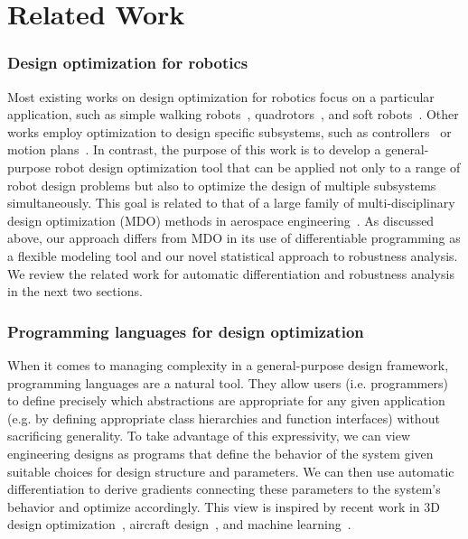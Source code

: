 \section{Related Work}\label{ch:rss:related_work}

\subsubsection{Design optimization for robotics}

Most existing works on design optimization for robotics focus on a particular application, such as simple walking robots~\cite{Schulz_robogami}, quadrotors~\cite{du2016computational}, and soft robots~\cite{soft_robot_optimization_review,du2021underwater,ma2021diffaqua}. Other works employ optimization to design specific subsystems, such as controllers~\cite{xu_uav_controllers} or motion plans~\cite{schulmanMotionPlanningSequential2014}.
In contrast, the purpose of this work is to develop a general-purpose robot design optimization tool that can be applied not only to a range of robot design problems but also to optimize the design of multiple subsystems simultaneously. This goal is related to that of a large family of multi-disciplinary design optimization (MDO) methods in aerospace engineering~\cite{Martins2013_mdo_survey}. As discussed above, our approach differs from MDO in its use of differentiable programming as a flexible modeling tool and our novel statistical approach to robustness analysis. We review the related work for automatic differentiation and robustness analysis in the next two sections.

\subsubsection{Programming languages for design optimization}

When it comes to managing complexity in a general-purpose design framework, programming languages are a natural tool. They allow users (i.e. programmers) to define precisely which abstractions are appropriate for any given application (e.g. by defining appropriate class hierarchies and function interfaces) without sacrificing generality. To take advantage of this expressivity, we can view engineering designs as programs that define the behavior of the system given suitable choices for design structure and parameters. We can then use automatic differentiation to derive gradients connecting these parameters to the system's behavior and optimize accordingly. This view is inspired by recent work in 3D design optimization~\cite{cascaval2021differentiable}, aircraft design~\cite{sharpe_thesis}, and machine learning~\cite{pytorch,jax2018github}.

